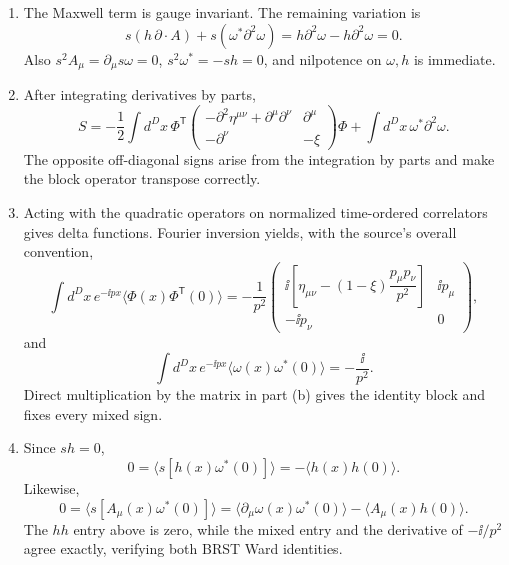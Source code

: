 \begin{enumerate}
  \begin{enumerate}
    \item[(a)] The Maxwell term is gauge invariant.  The remaining variation
      is
      \[
        s(h\,\partial\cdot A)+s(\omega^*\partial^2\omega)
        =h\partial^2\omega-h\partial^2\omega=0.
      \]
      Also \(s^2A_\mu=\partial_\mu s\omega=0\),
      \(s^2\omega^*=-sh=0\), and nilpotence on \(\omega,h\) is immediate.
    \item[(b)] After integrating derivatives by parts,
      \[
        S=-\frac12\int d^Dx\,\Phi^{\mathsf T}
        \begin{pmatrix}
          -\partial^2\eta^{\mu\nu}+\partial^\mu\partial^\nu
            &\partial^\mu\\
          -\partial^\nu&-\xi
        \end{pmatrix}\Phi
        +\int d^Dx\,\omega^*\partial^2\omega .
      \]
      The opposite off-diagonal signs arise from the integration by parts
      and make the block operator transpose correctly.
    \item[(c)] Acting with the quadratic operators on normalized
      time-ordered correlators gives delta functions.  Fourier inversion
      yields, with the source's overall convention,
      \[
        \int d^Dx\,e^{-\ii px}\langle\Phi(x)\Phi^{\mathsf T}(0)\rangle
        =-\frac1{p^2}
        \begin{pmatrix}
          \ii\!\left[\eta_{\mu\nu}
             -(1-\xi)\dfrac{p_\mu p_\nu}{p^2}\right]&\ii p_\mu\\
          -\ii p_\nu&0
        \end{pmatrix},
      \]
      and
      \[
        \int d^Dx\,e^{-\ii px}
          \langle\omega(x)\omega^*(0)\rangle=-\frac{\ii}{p^2}.
      \]
      Direct multiplication by the matrix in part (b) gives the identity
      block and fixes every mixed sign.
    \item[(d)] Since \(sh=0\),
      \[
        0=\langle s[h(x)\omega^*(0)]\rangle
          =-\langle h(x)h(0)\rangle .
      \]
      Likewise,
      \[
        0=\langle s[A_\mu(x)\omega^*(0)]\rangle
          =\langle\partial_\mu\omega(x)\omega^*(0)\rangle
           -\langle A_\mu(x)h(0)\rangle .
      \]
      The \(hh\) entry above is zero, while the mixed entry and the
      derivative of \(-\ii/p^2\) agree exactly, verifying both BRST Ward
      identities.
  \end{enumerate}


\end{enumerate}
